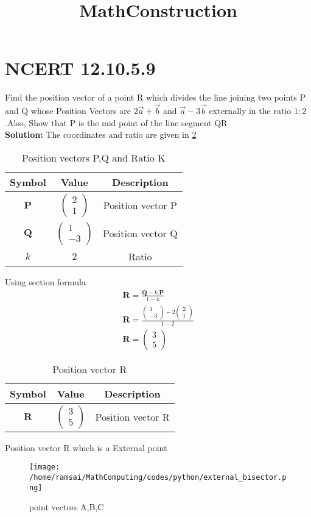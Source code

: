 \documentclass{article}
\title{MathConstruction}
\newcommand{\myvec}[1]{\ensuremath{\begin{pmatrix}#1\end{pmatrix}}}
\let\vec\mathbf
\begin{document}
\section{NCERT 12.10.5.9}

Find the position vector of a point R which divides the line joining two points P and Q whose Position Vectors are $2\overrightarrow{a}+\overrightarrow{b}$ and $\overrightarrow{a}-3\overrightarrow{b}$ externally in the ratio $1:2$.Also, Show that P is the mid point of the line segment QR  \\
\textbf{Solution:}
The coordinates and ratio are given in \ref{tab:mytable}
\begin{table}[h]
    \centering
    \begin{tabular}{|c|c|c|}
        \hline
	\textbf{Symbol} & \textbf{Value} & \textbf{Description}\\
        \hline
	$\vec{P}$ & $\myvec{2\\1}$ & Position vector P\\
        \hline
	$\vec{Q}$ & $\myvec{1\\-3}$ & Position vector Q\\
        \hline
	$k$ & $2$ & Ratio\\
        \hline
    \end{tabular}
    \label{tab:mytable}
    \caption{Position vectors P,Q and Ratio K}
\end{table}

Using section formula
\begin{align}
    \vec{R}=\frac{\vec{Q}-k.\vec{P}}{1-k}\\
    \vec{R}=\frac{\myvec{1\\-3}-2\myvec{2\\1}}{1-2}\\
    \vec{R}=\myvec{3\\5}
\end{align}
\begin{table}[h]
    \centering
    \begin{tabular}{|c|c|c|}
        \hline
	\textbf{Symbol} & \textbf{Value} & \textbf{Description} \\
        \hline
	$\vec{R}$ & $\myvec{3\\5}$  & Position vector R\\
        \hline
    \end{tabular}
    \label{tab:mytable}
    \caption{Position vector R}
\end{table}
Position vector R which is a External point
\begin{figure}[!ht]
    \centering
    \texttt{[image: /home/ramsai/MathComputing/codes/python/external\_bisector.png]}
    \caption{point vectors A,B,C}
    \label{fig:enter-label}
\end{figure}
\end{document}
